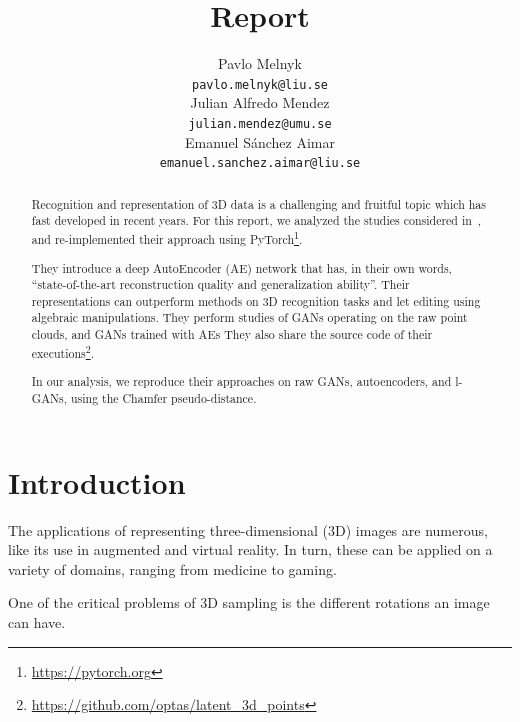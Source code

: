 \documentclass[12pt]{article}
\title{Report}
\author{
    Pavlo Melnyk \\
    \texttt{pavlo.melnyk@liu.se} \\
    \And
    Julian Alfredo Mendez \\
    \texttt{julian.mendez@umu.se} \\
    \And
    Emanuel S\'{a}nchez Aimar \\
    \texttt{emanuel.sanchez.aimar@liu.se} \\
}
\newcommand{\contentdescription}[1]{}
\begin{document}
    \maketitle

    \begin{abstract}
        \contentdescription{
            Abstract (5-10\%):
            Give an overview of what you have done in the project with the key results and findings of your work.
            Should be no more than 300 words.
        }

        Recognition and representation of 3D data is a challenging and fruitful topic which has fast developed in recent years.
        For this report,  we analyzed the studies considered in~\cite{pmlr-v80-achlioptas18a}, and re-implemented their approach using PyTorch\footnote{\url{https://pytorch.org}}.

        They introduce a deep AutoEncoder (AE) network that has, in their own words, ``state-of-the-art reconstruction quality and generalization ability''.
        Their representations can outperform methods on 3D recognition tasks and let editing using algebraic manipulations.
        They perform studies of GANs operating on the raw point clouds, and GANs trained with AEs
        They also share the source code of their executions\footnote{\url{https://github.com/optas/latent_3d_points}}.

        In our analysis, we reproduce their approaches on raw GANs, autoencoders, and l-GANs, using the Chamfer pseudo-distance.
    \end{abstract}


    \section{Introduction}

    \contentdescription{
        Introduction (5-15\%):
        Describe the problem, the approach of the paper, the experiments, and the results.
        At the high-level talk about what you worked on in your project and why it is important.
        Then give an overview of your results.
    }

    The applications of representing three-dimensional (3D) images are numerous, like its use in augmented and virtual reality.
    In turn, these can be applied on a variety of domains, ranging from medicine to gaming.

    One of the critical problems of 3D sampling is the different rotations an image can have.
\end{document}

